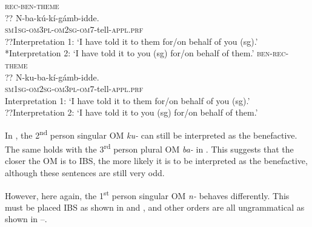 \documentclass[output=paper,
            colorlinks, citecolor=brown
            ,draftmode
		  ]{langscibook}
\begin{document}
\ea%
    \label{ex:yoneda:52}
    \ea\label{ex:yoneda:52a} \textsc{rec-ben}-\textsc{theme}\\
        \gll   ?? N-ba-kú-kí-gámb-idde. \\
        {} \textsc{sm1sg-om3pl-om2sg-om7}-tell-\textsc{appl.prf}\\
    \glt ??Interpretation 1:  ‘I have told it to them for/on behalf of you (sg).'      \\ 
    *Interpretation 2:  ‘I have told it to you (sg) for/on behalf of them.'
    \ex\label{ex:yoneda:52b} \textsc{ben-rec}-\textsc{theme}\\
    \gll ?? N-ku-ba-kí-gámb-idde.   \\
      {} \textsc{sm1sg-om2sg-om3pl-om7}-tell-\textsc{appl.prf}\\              
       \glt *Interpretation 1:   ‘I have told it to them for/on behalf of you (sg).’     \\  
    ??Interpretation 2:   ‘I have told it to you (sg) for/on behalf of them.’
    \z
\z


In , the 2\textsuperscript{nd} person singular OM \textit{ku-} can still be interpreted as the benefactive. The same holds with the 3\textsuperscript{rd} person plural OM \textit{ba-} in . This suggests that the closer the OM is to IBS, the more likely it is to be interpreted as the benefactive, although these sentences are still very odd. 



    However, here again, the 1\textsuperscript{st} person singular OM \textit{n-} behaves differently. This must be placed IBS as shown in  and , and other orders are all ungrammatical as shown in --. 


\ea%
    \label{ex:yoneda:53}
    \z
\z
\end{document}
